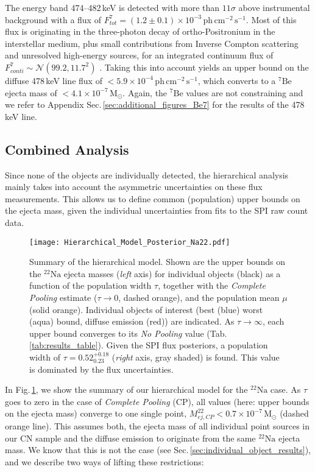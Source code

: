 \documentclass{aa}
\newcommand{\mrm}[1]{\mathrm{#1}}
\newcommand{\nuc}[2]{$\mrm{^{#2}#1}$}
\begin{document}
The energy band 474--482\,keV is detected with more than $11\sigma$ above instrumental background with a flux of $F_{tot}^7 = (1.2 \pm 0.1) \times 10^{-3}\,\mrm{ph\,cm^{-2}\,s^{-1}}$.
%
Most of this flux is originating in the three-photon decay of ortho-Positronium in the interstellar medium, plus small contributions from Inverse Compton scattering and unresolved high-energy sources, for an integrated continuum flux of $F_{conti}^7 \sim \mathscr{N}(99.2,11.7^2)$ \citep[e.g.][]{Strong2005_gammaconti,Bouchet2011_diffuseCR,Siegert2016_511}.
%
Taking this into account yields an upper bound on the diffuse 478\,keV line flux of $<5.9 \times 10^{-4}\,\mrm{ph\,cm^{-2}\,s^{-1}}$, which converts to a \nuc{Be}{7} ejecta mass of $<4.1 \times 10^{-7}\,\mrm{M_{\odot}}$.
%
Again, the \nuc{Be}{7} values are not constraining and we refer to Appendix Sec.\,\ref{sec:additional_figures_Be7} for the results of the 478\,keV line.


\subsection{Combined Analysis}\label{sec:combined_analysis}
%
Since none of the objects are individually detected, the hierarchical analysis mainly takes into account the asymmetric uncertainties on these flux measurements.
%
This allows us to define common (population) upper bounds on the ejecta mass, given the individual uncertainties from fits to the SPI raw count data.
%
\begin{figure}[!hbtp]
	\centering
	\texttt{[image: Hierarchical\_Model\_Posterior\_Na22.pdf]}
	\caption{Summary of the hierarchical model. Shown are the upper bounds on the \nuc{Na}{22} ejecta masses (\textit{left} axis) for individual objects (black) as a function of the population width $\tau$, together with the \textit{Complete Pooling} estimate ($\tau \rightarrow 0$, dashed orange), and the population mean $\mu$ (solid orange). Individual objects of interest (best (blue) worst (aqua) bound, diffuse emission (red)) are indicated. As $\tau \rightarrow \infty$, each upper bound converges to its \textit{No Pooling} value (Tab.\,\ref{tab:results_table}). Given the SPI flux posteriors, a population width of $\tau = 0.52^{+0.18}_{0.23}$ (\textit{right} axis, gray shaded) is found. This value is dominated by the flux uncertainties.}
	\label{fig:summary_plot_hierarchical_model}
\end{figure}

In Fig.\,\ref{fig:summary_plot_hierarchical_model}, we show the summary of our hierarchical model for the \nuc{Na}{22} case.
%
As $\tau$ goes to zero in the case of \textit{Complete Pooling} (CP), all values (here: upper bounds on the ejecta mass) converge to one single point, $M_{ej,CP}^{22} < 0.7 \times 10^{-7}\,\mrm{M_{\odot}}$ (dashed orange line).
%
This assumes both, the ejecta mass of all individual point sources in our CN sample and the diffuse emission to originate from the same \nuc{Na}{22} ejecta mass.
%
We know that this is not the case (see Sec.\,\ref{sec:individual_object_results}), and we describe two ways of lifting these restrictions:
\end{document}
